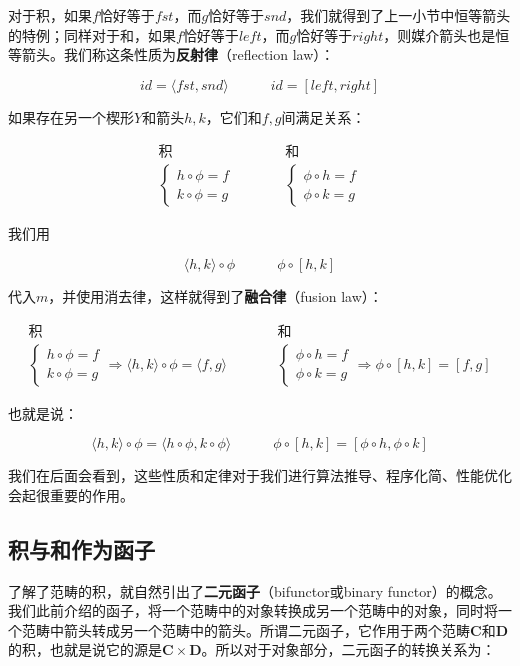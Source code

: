 \documentclass[b5paper]{ctexart}
\begin{document}
对于积，如果$f$恰好等于$fst$，而$g$恰好等于$snd$，我们就得到了上一小节中恒等箭头的特例；同样对于和，如果$f$恰好等于$left$，而$g$恰好等于$right$，则媒介箭头也是恒等箭头。我们称这条性质为\textbf{反射律}（reflection law）：

\[
id = \langle fst, snd \rangle \quad \quad \quad id = [left, right]
\]

如果存在另一个楔形$Y$和箭头$h, k$，它们和$f, g$间满足关系：

\[
\begin{array}{ccc}
  \text{积} & & \text{和} \\
  \begin{cases}
  h \circ \phi = f \\
  k \circ \phi = g
  \end{cases}
  & \quad \quad &
  \begin{cases}
  \phi \circ h = f \\
  \phi \circ k = g
  \end{cases}
\end{array}
\]

我们用

\[
\langle h, k \rangle \circ \phi \quad \quad \quad \phi \circ [h, k]
\]

代入$m$，并使用消去律，这样就得到了\textbf{融合律}（fusion law）：

\[
\begin{array}{ccc}
  \text{积} & & \text{和} \\
  \begin{cases}
  h \circ \phi = f \\
  k \circ \phi = g
  \end{cases} \Rightarrow
    \langle h, k \rangle \circ \phi = \langle f, g \rangle
  & \quad \quad &
  \begin{cases}
  \phi \circ h = f \\
  \phi \circ k = g
  \end{cases} \Rightarrow
    \phi \circ [h, k] = [f, g]
\end{array}
\]

也就是说：

\[
\langle h, k \rangle \circ \phi = \langle h \circ \phi, k \circ \phi \rangle
\quad \quad \quad
\phi \circ [h, k] = [\phi \circ h, \phi \circ k]
\]

我们在后面会看到，这些性质和定律对于我们进行算法推导、程序化简、性能优化会起很重要的作用。

\subsection{积与和作为函子}
了解了范畴的积，就自然引出了\textbf{二元函子}（bifunctor或binary functor）的概念。我们此前介绍的函子，将一个范畴中的对象转换成另一个范畴中的对象，同时将一个范畴中箭头转成另一个范畴中的箭头。所谓二元函子，它作用于两个范畴$\pmb{C}$和$\pmb{D}$的积，也就是说它的源是$\pmb{C} \times \pmb{D}$。所以对于对象部分，二元函子的转换关系为：
\end{document}
